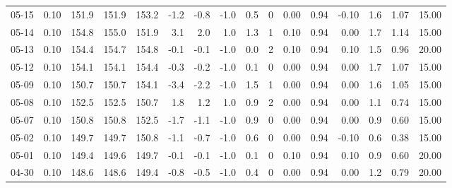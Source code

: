 \begin{threeparttable}
{\begin{tabular}{lrrrrrrrrrrrrrrr}
  05-15 &     0.10 & 151.9 & 151.9 & 153.2 &       -1.2 &           -0.8 &                     -1.0 &                 0.5 &              0 &       0.00 &      0.94 &          -0.10 &              1.6 &            1.07 &                  15.00 \\
  05-14 &     0.10 & 154.8 & 155.0 & 151.9 &        3.1 &            2.0 &                      1.0 &                 1.3 &              1 &       0.10 &      0.94 &           0.00 &              1.7 &            1.14 &                  15.00 \\
  05-13 &     0.10 & 154.4 & 154.7 & 154.8 &       -0.1 &           -0.1 &                     -1.0 &                 0.0 &              2 &       0.10 &      0.94 &           0.10 &              1.5 &            0.96 &                  20.00 \\
  05-12 &     0.10 & 154.1 & 154.1 & 154.4 &       -0.3 &           -0.2 &                     -1.0 &                 0.1 &              0 &       0.00 &      0.94 &           0.00 &              1.7 &            1.07 &                  15.00 \\
  05-09 &     0.10 & 150.7 & 150.7 & 154.1 &       -3.4 &           -2.2 &                     -1.0 &                 1.5 &              1 &       0.00 &      0.94 &           0.00 &              1.6 &            1.05 &                  15.00 \\
  05-08 &     0.10 & 152.5 & 152.5 & 150.7 &        1.8 &            1.2 &                      1.0 &                 0.9 &              2 &       0.00 &      0.94 &           0.00 &              1.1 &            0.74 &                  15.00 \\
  05-07 &     0.10 & 150.8 & 150.8 & 152.5 &       -1.7 &           -1.1 &                     -1.0 &                 0.9 &              0 &       0.00 &      0.94 &           0.00 &              0.9 &            0.60 &                  15.00 \\
  05-02 &     0.10 & 149.7 & 149.7 & 150.8 &       -1.1 &           -0.7 &                     -1.0 &                 0.6 &              0 &       0.00 &      0.94 &          -0.10 &              0.6 &            0.38 &                  15.00 \\
  05-01 &     0.10 & 149.4 & 149.6 & 149.7 &       -0.1 &           -0.1 &                     -1.0 &                 0.1 &              0 &       0.10 &      0.94 &           0.10 &              0.9 &            0.60 &                  20.00 \\
  04-30 &     0.10 & 148.6 & 148.6 & 149.4 &       -0.8 &           -0.5 &                     -1.0 &                 0.4 &              0 &       0.00 &      0.94 &           0.00 &              1.2 &            0.79 &                  20.00 \\

\end{tabular}}
\end{threeparttable}
